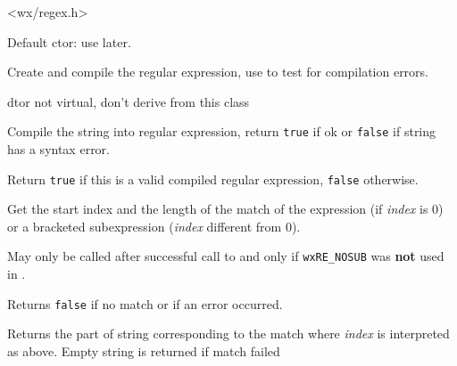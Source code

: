 
<wx/regex.h>


\label{wxregexwxregex}


Default ctor: use  later.


Create and compile the regular expression, use 
 to test for compilation errors.

\label{wxregexdtor}


dtor not virtual, don't derive from this class

\label{wxregexcompile}


Compile the string into regular expression, return {\tt true} if ok or {\tt false} 
if string has a syntax error.

\label{wxregexisvalid}


Return {\tt true} if this is a valid compiled regular expression, {\tt false} 
otherwise.

\label{wxregexgetmatch}


Get the start index and the length of the match of the expression
(if {\it index} is $0$) or a bracketed subexpression ({\it index} different
from $0$).

May only be called after successful call to  
and only if {\tt wxRE\_NOSUB} was {\bf not} used in 
.

Returns {\tt false} if no match or if an error occurred.


Returns the part of string corresponding to the match where {\it index} is
interpreted as above. Empty string is returned if match failed

